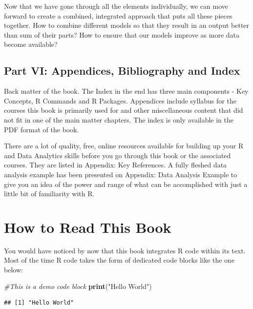 \documentclass[]{krantz}
\makeatletter
\newenvironment{Shaded}{\begin{snugshade}}{\end{snugshade}}
\newcommand{\KeywordTok}[1]{\textcolor[rgb]{0.27,0.27,0.27}{\textbf{#1}}}
\newcommand{\StringTok}[1]{\textcolor[rgb]{0.5,0.5,0.5}{#1}}
\newcommand{\CommentTok}[1]{\textcolor[rgb]{0.56,0.35,0.01}{\textit{#1}}}
\newcommand{\NormalTok}[1]{#1}
\newenvironment{kframe}{%
\medskip{}
\setlength{\fboxsep}{.8em}
 \def\at@end@of@kframe{}%
 \ifinner\ifhmode%
  \def\at@end@of@kframe{\end{minipage}}%
  \begin{minipage}{\columnwidth}%
 \fi\fi%
 \def\FrameCommand##1{\hskip\@totalleftmargin \hskip-\fboxsep
 \colorbox{shadecolor}{##1}\hskip-\fboxsep
     \hskip-\linewidth \hskip-\@totalleftmargin \hskip\columnwidth}%
 \MakeFramed {\advance\hsize-\width
   \@totalleftmargin\z@ \linewidth\hsize
   \@setminipage}}%
 {\par\unskip\endMakeFramed%
 \at@end@of@kframe}
\renewenvironment{Shaded}{\begin{kframe}}{\end{kframe}}
\theoremstyle{definition}
\theoremstyle{definition}
\theoremstyle{definition}
\theoremstyle{remark}
\makeatother
\begin{document}
Now that we have gone through all the elements individually, we can move
forward to create a combined, integrated approach that puts all these
pieces together. How to combine different models so that they result in
an output better than sum of their parts? How to ensure that our models
improve as more data become available?

\subsection*{Part VI: Appendices, Bibliography and
Index}\label{part-vi-appendices-bibliography-and-index}

Back matter of the book. The Index in the end has three main components
- Key Concepts, R Commands and R Packages. Appendices include syllabus
for the courses this book is primarily used for and other miscellaneous
content that did not fit in one of the main matter chapters. The index
is only available in the PDF format of the book.

There are a lot of quality, free, online resources available for
building up your R and Data Analytics skills before you go through this
book or the associated courses. They are listed in Appendix: Key
References. A fully fleshed data analysis example has been presented on
Appendix: Data Analysis Example to give you an idea of the power and
range of what can be accomplished with just a little bit of familiarity
with R.

\section*{How to Read This Book}\label{how-to-read-this-book}


You would have noticed by now that this book integrates R code within
its text. Most of the time R code takes the form of dedicated code
blocks like the one below:

\begin{Shaded}
\begin{Highlighting}[]
\CommentTok{#This is a demo code block}
\KeywordTok{print}\NormalTok{(}\StringTok{"Hello World"}\NormalTok{)}
\end{Highlighting}
\end{Shaded}

\begin{verbatim}
## [1] "Hello World"
\end{verbatim}
\end{document}
